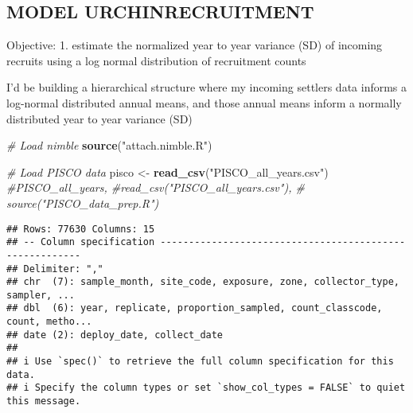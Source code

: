 \documentclass[
]{article}
\newenvironment{Shaded}{\begin{snugshade}}{\end{snugshade}}
\newcommand{\CommentTok}[1]{\textcolor[rgb]{0.56,0.35,0.01}{\textit{#1}}}
\newcommand{\FunctionTok}[1]{\textcolor[rgb]{0.13,0.29,0.53}{\textbf{#1}}}
\newcommand{\NormalTok}[1]{#1}
\newcommand{\OtherTok}[1]{\textcolor[rgb]{0.56,0.35,0.01}{#1}}
\newcommand{\StringTok}[1]{\textcolor[rgb]{0.31,0.60,0.02}{#1}}
\begin{document}
\subsection{MODEL URCHINRECRUITMENT}\label{model-urchinrecruitment}

Objective: 1. estimate the normalized year to year variance (SD) of
incoming recruits using a log normal distribution of recruitment counts

I'd be building a hierarchical structure where my incoming settlers data
informs a log-normal distributed annual means, and those annual means
inform a normally distributed year to year variance (SD)

\begin{Shaded}
\begin{Highlighting}[]
\CommentTok{\# Load nimble}
\FunctionTok{source}\NormalTok{(}\StringTok{"attach.nimble.R"}\NormalTok{)}

\CommentTok{\# Load PISCO data}
\NormalTok{pisco }\OtherTok{\textless{}{-}} \FunctionTok{read\_csv}\NormalTok{(}\StringTok{"PISCO\_all\_years.csv"}\NormalTok{) }\CommentTok{\#PISCO\_all\_years, \#read\_csv("PISCO\_all\_years.csv"), \# source("PISCO\_data\_prep.R")}
\end{Highlighting}
\end{Shaded}

\begin{verbatim}
## Rows: 77630 Columns: 15
## -- Column specification --------------------------------------------------------
## Delimiter: ","
## chr  (7): sample_month, site_code, exposure, zone, collector_type, sampler, ...
## dbl  (6): year, replicate, proportion_sampled, count_classcode, count, metho...
## date (2): deploy_date, collect_date
## 
## i Use `spec()` to retrieve the full column specification for this data.
## i Specify the column types or set `show_col_types = FALSE` to quiet this message.
\end{verbatim}
\end{document}
